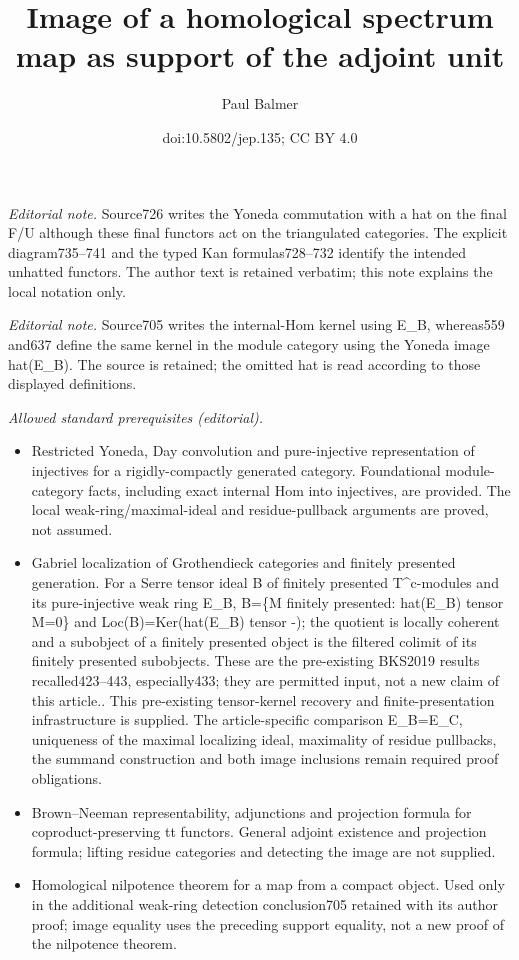\documentclass[10pt,a4paper]{amsart}
\title{Image of a homological spectrum map as support of the adjoint unit}
\author{Paul Balmer}
\date{doi:10.5802/jep.135; CC BY 4.0}
\numberwithin{equation}{section}
\theoremstyle{definition}
\begin{document}
\maketitle
\noindent\textit{Editorial note.} Source726 writes the Yoneda commutation with a hat on the final F/U although these final functors act on the triangulated categories. The explicit diagram735–741 and the typed Kan formulas728–732 identify the intended unhatted functors. The author text is retained verbatim; this note explains the local notation only.\par\medskip
\noindent\textit{Editorial note.} Source705 writes the internal-Hom kernel using E\_B, whereas559 and637 define the same kernel in the module category using the Yoneda image hat(E\_B). The source is retained; the omitted hat is read according to those displayed definitions.\par\medskip
\noindent\textit{Allowed standard prerequisites (editorial).}\begin{itemize}
\item Restricted Yoneda, Day convolution and pure-injective representation of injectives for a rigidly-compactly generated category. Foundational module-category facts, including exact internal Hom into injectives, are provided. The local weak-ring/maximal-ideal and residue-pullback arguments are proved, not assumed.
\item Gabriel localization of Grothendieck categories and finitely presented generation. For a Serre tensor ideal B of finitely presented T\textasciicircum{}c-modules and its pure-injective weak ring E\_B, B=\{M finitely presented: hat(E\_B) tensor M=0\} and Loc(B)=Ker(hat(E\_B) tensor -); the quotient is locally coherent and a subobject of a finitely presented object is the filtered colimit of its finitely presented subobjects. These are the pre-existing BKS2019 results recalled423–443, especially433; they are permitted input, not a new claim of this article.. This pre-existing tensor-kernel recovery and finite-presentation infrastructure is supplied. The article-specific comparison E\_B=E\_C, uniqueness of the maximal localizing ideal, maximality of residue pullbacks, the summand construction and both image inclusions remain required proof obligations.
\item Brown–Neeman representability, adjunctions and projection formula for coproduct-preserving tt functors. General adjoint existence and projection formula; lifting residue categories and detecting the image are not supplied.
\item Homological nilpotence theorem for a map from a compact object. Used only in the additional weak-ring detection conclusion705 retained with its author proof; image equality uses the preceding support equality, not a new proof of the nilpotence theorem.
\end{itemize}\medskip
\end{document}
